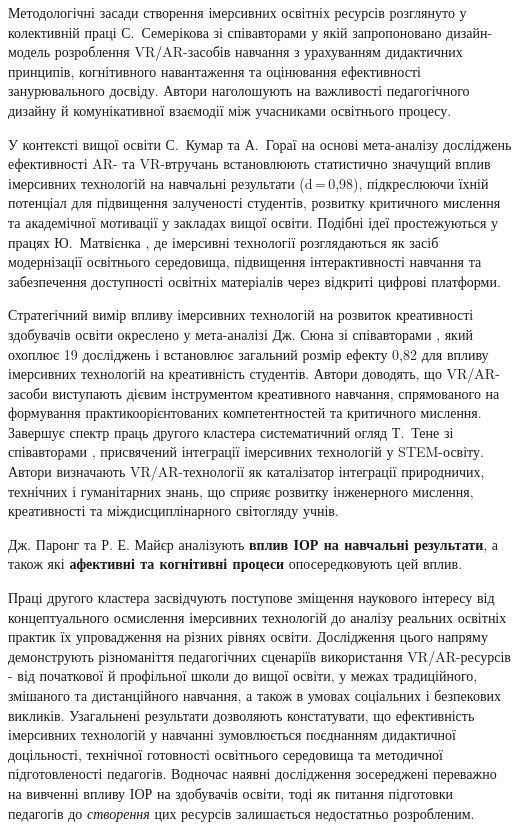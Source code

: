 Методологічні засади створення імерсивних освітніх ресурсів розглянуто у колективній праці С.~Семерікова зі співавторами \cite{Semerikov2022IERDesign} у якій запропоновано дизайн-модель розроблення VR/AR-засобів навчання з урахуванням дидактичних принципів, когнітивного навантаження та оцінювання ефективності занурювального досвіду. Автори наголошують на важливості педагогічного дизайну й комунікативної взаємодії між учасниками освітнього процесу.

У контексті вищої освіти С.~Кумар та А.~Гораї \cite{Gnedina2025Quality} на основі мета-аналізу досліджень ефективності AR- та VR-втручань встановлюють статистично значущий вплив імерсивних технологій на навчальні результати (d\,=\,0{,}98), підкреслюючи їхній потенціал для підвищення залученості студентів, розвитку критичного мислення та академічної мотивації у закладах вищої освіти. Подібні ідеї простежуються у працях Ю.~Матвієнка \cite{Lytvynova2023Comparative}, де імерсивні технології розглядаються як засіб модернізації освітнього середовища, підвищення інтерактивності навчання та забезпечення доступності освітніх матеріалів через відкриті цифрові платформи.

Стратегічний вимір впливу імерсивних технологій на розвиток креативності здобувачів освіти окреслено у мета-аналізі Дж. Сюна зі співавторами \cite{Kindzhibala2025Creative}, який охоплює 19 досліджень і встановлює загальний розмір ефекту 0{,}82 для впливу імерсивних технологій на креативність студентів. Автори доводять, що VR/AR-засоби виступають дієвим інструментом креативного навчання, спрямованого на формування практикоорієнтованих компетентностей та критичного мислення. Завершує спектр праць другого кластера систематичний огляд Т.~Тене зі співавторами \cite{Medvedieva2024STEAM}, присвячений інтеграції імерсивних технологій у STEM-освіту. Автори визначають VR/AR-технології як каталізатор інтеграції природничих, технічних і гуманітарних знань, що сприяє розвитку інженерного мислення, креативності та міждисциплінарного світогляду учнів.

Дж. Паронг та Р. Е. Майєр \cite{Parong2021Cognitive} аналізують \textbf{вплив ІОР на навчальні результати}, а також які \textbf{афективні та когнітивні процеси} опосередковують цей вплив.

Праці другого кластера засвідчують поступове зміщення наукового інтересу від концептуального осмислення імерсивних технологій до аналізу реальних освітніх практик їх упровадження на різних рівнях освіти. Дослідження цього напряму демонструють різноманіття педагогічних сценаріїв використання VR/AR-ресурсів - від початкової й профільної школи до вищої освіти, у межах традиційного, змішаного та дистанційного навчання, а також в умовах соціальних і безпекових викликів. Узагальнені результати дозволяють констатувати, що ефективність імерсивних технологій у навчанні зумовлюється поєднанням дидактичної доцільності, технічної готовності освітнього середовища та методичної підготовленості педагогів. Водночас наявні дослідження зосереджені переважно на вивченні впливу ІОР на здобувачів освіти, тоді як питання підготовки педагогів до \emph{створення} цих ресурсів залишається недостатньо розробленим.

